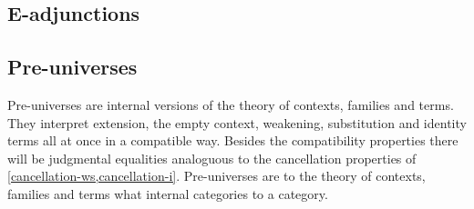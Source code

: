 \subsection{E-adjunctions}

\subsection{Pre-universes}
Pre-universes are internal versions of the theory of contexts, families and
terms. They interpret extension, the empty context, weakening, substitution
and identity terms all at once in a compatible way. Besides the compatibility
properties there will be judgmental equalities analoguous to the cancellation
properties of \autoref{cancellation-ws,cancellation-i}. Pre-universes are to
the theory of contexts, families and terms what internal categories to a
category.

